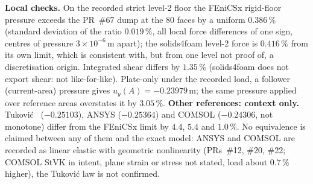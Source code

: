 \documentclass[sn-mathphys,Numbered]{sn-jnl}
\begin{document}
\textbf{Local checks.} On the recorded strict level-2 floor the FEniCSx rigid-floor pressure exceeds the PR~\#67 dump at the 80 faces by a uniform $0.386\,\%$ (standard deviation of the ratio $0.019\,\%$, all local force differences of one sign, centres of pressure $3\times10^{-6}\,\mathrm m$ apart); the solids4foam level-2 force is $0.416\,\%$ from its own limit, which is consistent with, but from one level not proof of, a discretisation origin. Integrated shear differs by $1.35\,\%$ (solids4foam does not export shear: not like-for-like). Plate-only under the recorded load, a follower (current-area) pressure gives $u_y(A)=-0.23979\,\mathrm m$; the same pressure applied over reference areas overstates it by $3.05\,\%$.
\textbf{Other references: context only.} Tukovi\'c~\citep{Tukovic2018} ($-0.25103$), ANSYS ($-0.25364$) and COMSOL ($-0.24306$, not monotone) differ from the FEniCSx limit by $4.4$, $5.4$ and $1.0\,\%$. No equivalence is claimed between any of them and the exact model: ANSYS and COMSOL are recorded as linear elastic with geometric nonlinearity (PRs~\#12, \#20, \#22; COMSOL StVK in intent, plane strain or stress not stated, load about $0.7\,\%$ higher), the Tukovi\'c law is not confirmed.
\end{document}
